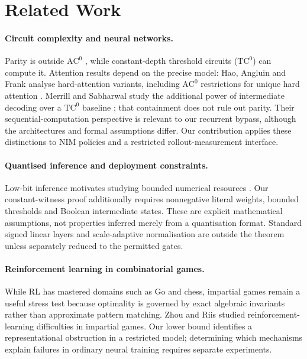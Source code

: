 \documentclass[twoside,11pt]{article}
\newcommand{\AC}{\mathrm{AC}}
\newcommand{\TC}{\mathrm{TC}}
\numberwithin{theorem}{section}
\numberwithin{equation}{section}
\begin{document}
\section{Related Work}
\label{sec:related}

\paragraph{Circuit complexity and neural networks.}
Parity is outside $\AC^0$ \citep{furst1984parity,hastad1986thesis}, while constant-depth threshold circuits ($\TC^0$) can compute it.
Attention results depend on the precise model: Hao, Angluin and Frank analyse hard-attention variants, including $\AC^0$ restrictions for unique hard attention \citep{hao2022hardattention}. Merrill and Sabharwal study the additional power of intermediate decoding over a $\TC^0$ baseline \citep{merrill2021transformer}; that containment does not rule out parity. Their sequential-computation perspective is relevant to our recurrent bypass, although the architectures and formal assumptions differ.
Our contribution applies these distinctions to NIM policies and a restricted rollout-measurement interface.

\paragraph{Quantised inference and deployment constraints.}
Low-bit inference motivates studying bounded numerical resources \citep{jacob2018integeronly,dettmers2022llmint8}. Our constant-witness proof additionally requires nonnegative literal weights, bounded thresholds and Boolean intermediate states. These are explicit mathematical assumptions, not properties inferred merely from a quantisation format. Standard signed linear layers and scale-adaptive normalisation are outside the theorem unless separately reduced to the permitted gates.

\paragraph{Reinforcement learning in combinatorial games.}
While RL has mastered domains such as Go and chess, impartial games remain a useful stress test because optimality is governed by exact algebraic invariants rather than approximate pattern matching.
Zhou and Riis \citep{zhou2022impartial,zhou2023parity} studied reinforcement-learning difficulties in impartial games.
Our lower bound identifies a representational obstruction in a restricted model; determining which mechanisms explain failures in ordinary neural training requires separate experiments.
\end{document}
